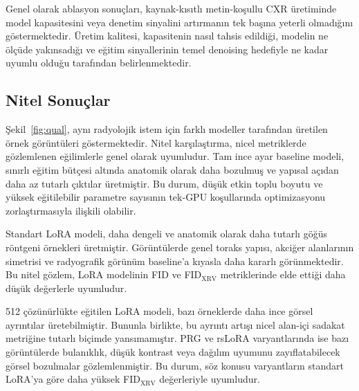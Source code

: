 \documentclass[11pt]{article}
\begin{document}
Genel olarak ablasyon sonuçları, kaynak-kısıtlı metin-koşullu CXR üretiminde
model kapasitesini veya denetim sinyalini artırmanın tek başına yeterli
olmadığını göstermektedir. Üretim kalitesi, kapasitenin nasıl tahsis edildiği,
modelin ne ölçüde yakınsadığı ve eğitim sinyallerinin temel denoising hedefiyle
ne kadar uyumlu olduğu tarafından belirlenmektedir.

\subsection{Nitel Sonuçlar}

Şekil~\ref{fig:qual}, aynı radyolojik istem için farklı modeller tarafından
üretilen örnek görüntüleri göstermektedir. Nitel karşılaştırma, nicel metriklerde
gözlemlenen eğilimlerle genel olarak uyumludur. Tam ince ayar baseline modeli,
sınırlı eğitim bütçesi altında anatomik olarak daha bozulmuş ve yapısal açıdan
daha az tutarlı çıktılar üretmiştir. Bu durum, düşük etkin toplu boyutu ve
yüksek eğitilebilir parametre sayısının tek-GPU koşullarında optimizasyonu
zorlaştırmasıyla ilişkili olabilir.

Standart LoRA modeli, daha dengeli ve anatomik olarak daha tutarlı göğüs
röntgeni örnekleri üretmiştir. Görüntülerde genel toraks yapısı, akciğer
alanlarının simetrisi ve radyografik görünüm baseline'a kıyasla daha kararlı
görünmektedir. Bu nitel gözlem, LoRA modelinin FID ve FID$_{\text{XRV}}$
metriklerinde elde ettiği daha düşük değerlerle uyumludur.

512 çözünürlükte eğitilen LoRA modeli, bazı örneklerde daha ince görsel
ayrıntılar üretebilmiştir. Bununla birlikte, bu ayrıntı artışı nicel alan-içi
sadakat metriğine tutarlı biçimde yansımamıştır. PRG ve rsLoRA varyantlarında
ise bazı görüntülerde bulanıklık, düşük kontrast veya dağılım uyumunu
zayıflatabilecek görsel bozulmalar gözlemlenmiştir. Bu durum, söz konusu
varyantların standart LoRA'ya göre daha yüksek FID$_{\text{XRV}}$ değerleriyle
uyumludur.
\end{document}

